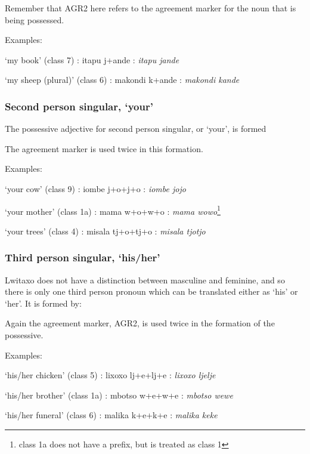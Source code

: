 
Remember that AGR2 here refers to the agreement marker for the noun that is being possessed.

Examples:\begin{wrdex}
\item `my book' (class 7) : \esh{}itapu \esh{}j+and\ezh{}e : \emph{\esh{}itapu \esh{}jand\ezh{}e}
\item `my  sheep (plural)' (class 6) : makondi k+and\ezh{}e : \emph{makondi kand\ezh{}e}
\end{wrdex}

\subsubsection{Second person singular, `your'}
The possessive adjective for second person singular, or `your', is formed


The agreement marker is used twice in this formation.

Examples:\begin{wrdex}
\item `your cow' (class 9) : i\engma{}ombe j+o+j+o : \emph{i\engma{}ombe jojo}
\item `your mother' (class 1a) : mama w+o+w+o : \emph{mama wowo}\footnote{class 1a does not have a prefix, but is treated as class 1}
\item`your trees' (class 4) : misala t\esh{}j+o+t\esh{}j+o : \emph{misala t\esh{}jot\esh{}jo}
\end{wrdex}

\subsubsection{Third person singular, `his/her'}
Lwitaxo does not have a distinction between masculine and feminine, and so there is only one third person pronoun which can be translated either as `his' or `her'.  It is formed by:


Again the agreement marker, AGR2, is used twice in the formation of the possessive.

Examples:\begin{wrdex}
\item `his/her chicken' (class 5) : lixoxo lj+e+lj+e :  \emph{lixoxo ljelje}
\item `his/her brother' (class 1a) : mbotso w+e+w+e : \emph{mbotso wewe}
\item `his/her funeral' (class 6) : malika k+e+k+e : \emph{malika keke}
\end{wrdex}

